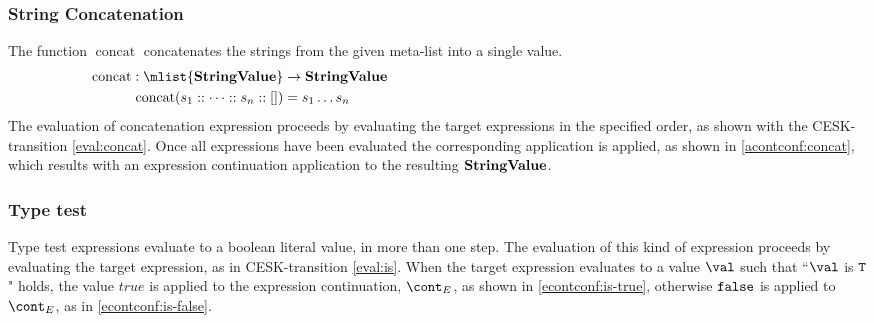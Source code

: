 \documentclass{article}
\DeclareMathOperator{\concat}{concat}
\begin{document}
\subsubsection{String Concatenation}
\label{subsubsec:string-concatenation}
The function $\concat$ concatenates the strings from the given meta-list into a single value.
\begin{align*}
  \concat : \mlist{\dstring} &\rightarrow \dstring \hspace{100mm} \\
  \concat( s_1 :: \dots :: s_n :: []) &= s_1 \dots s_n
\end{align*}
The evaluation of concatenation expression proceeds by evaluating the target expressions in the specified order, as shown with the CESK-transition \eqref{eval:concat}.
Once all expressions have been evaluated the corresponding application is applied, as shown in \eqref{acontconf:concat}, which results with an expression continuation application to the resulting $\mathbf{StringValue}$.
\subsubsection{Type test}
\label{subsubsec:type-test}
Type test expressions evaluate to a boolean literal value, in more than one step.
The evaluation of this kind of expression proceeds by evaluating the target expression, as in CESK-transition \eqref{eval:is}.
When the target expression evaluates to a value $\val$ such that ``$\val $ is $\tt{T}$" holds, the value $true$ is applied to the expression continuation, $\econt$, as shown in \eqref{econtconf:is-true}, otherwise $\tt{false}$ is applied to $\econt$, as in \eqref{econtconf:is-false}. 
\end{document}

